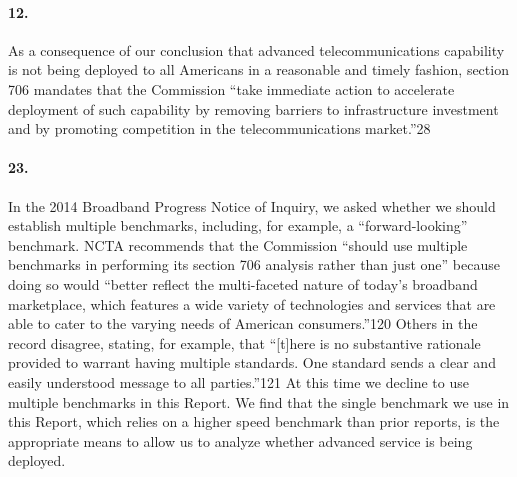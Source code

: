 \paragraph{12. }
As a consequence of our conclusion that advanced telecommunications capability is not being deployed to all Americans in a reasonable and timely fashion, section 706 mandates that the Commission ``take immediate action to accelerate deployment of such capability by removing barriers to infrastructure investment and by promoting competition in the telecommunications market.''28

\paragraph{23. } In the 2014 Broadband Progress Notice of Inquiry, we asked whether we should establish multiple benchmarks, including, for example, a ``forward-looking'' benchmark.
NCTA recommends that the Commission ``should use multiple benchmarks in performing its section 706 analysis rather than just one'' because doing so would ``better reflect the multi-faceted nature of today’s broadband marketplace, which features a wide variety of technologies and services that are able to cater to the varying needs of American consumers.''120
Others in the record disagree, stating, for example, that
``[t]here is no substantive rationale provided to warrant having multiple standards. One standard sends a clear and easily understood message to all parties.''121
At this time we decline to use multiple benchmarks
in this Report. We find that the single benchmark we use in this Report, which relies on a higher speed benchmark than prior reports, is the appropriate means to allow us to analyze whether advanced service is being deployed.

